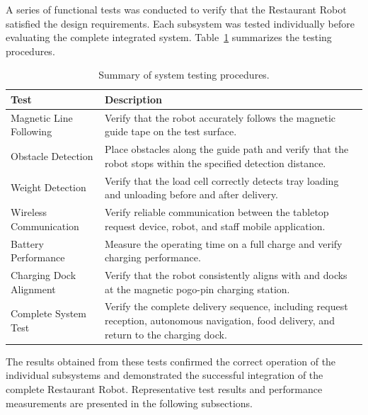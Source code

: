 \documentclass[12pt,a4paper]{article}
\begin{document}
A series of functional tests was conducted to verify that the
Restaurant Robot satisfied the design requirements. Each subsystem was
tested individually before evaluating the complete integrated system.
Table~\ref{tab:testing-plan} summarizes the testing procedures.

\begin{table}[H]
\centering
\caption{Summary of system testing procedures.}
\label{tab:testing-plan}
\renewcommand{\arraystretch}{1.3}
\begin{tabular}{@{}p{3.8cm}p{9.2cm}@{}}
\toprule
\textbf{Test} & \textbf{Description} \\
\midrule
Magnetic Line Following &
Verify that the robot accurately follows the magnetic guide tape on the test surface. \\

Obstacle Detection &
Place obstacles along the guide path and verify that the robot stops within the specified detection distance. \\

Weight Detection &
Verify that the load cell correctly detects tray loading and unloading before and after delivery. \\

Wireless Communication &
Verify reliable communication between the tabletop request device, robot, and staff mobile application. \\

Battery Performance &
Measure the operating time on a full charge and verify charging performance. \\

Charging Dock Alignment &
Verify that the robot consistently aligns with and docks at the magnetic pogo-pin charging station. \\

Complete System Test &
Verify the complete delivery sequence, including request reception, autonomous navigation, food delivery, and return to the charging dock. \\
\bottomrule
\end{tabular}
\end{table}

The results obtained from these tests confirmed the correct operation
of the individual subsystems and demonstrated the successful
integration of the complete Restaurant Robot. Representative test
results and performance measurements are presented in the following
subsections.


\end{document}
